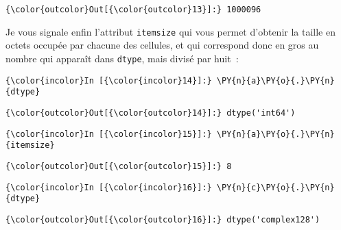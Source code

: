 \begin{Verbatim}[commandchars=\\\{\},frame=single,framerule=0.3mm,rulecolor=\color{cellframecolor}]
{\color{outcolor}Out[{\color{outcolor}13}]:} 1000096
\end{Verbatim}
            
    Je vous signale enfin l'attribut \texttt{itemsize} qui vous permet
d'obtenir la taille en octets occupée par chacune des cellules, et qui
correspond donc en gros au nombre qui apparaît dans \texttt{dtype}, mais
divisé par huit~:

    \begin{Verbatim}[commandchars=\\\{\},frame=single,framerule=0.3mm,rulecolor=\color{cellframecolor}]
{\color{incolor}In [{\color{incolor}14}]:} \PY{n}{a}\PY{o}{.}\PY{n}{dtype}
\end{Verbatim}


\begin{Verbatim}[commandchars=\\\{\},frame=single,framerule=0.3mm,rulecolor=\color{cellframecolor}]
{\color{outcolor}Out[{\color{outcolor}14}]:} dtype('int64')
\end{Verbatim}
            
    \begin{Verbatim}[commandchars=\\\{\},frame=single,framerule=0.3mm,rulecolor=\color{cellframecolor}]
{\color{incolor}In [{\color{incolor}15}]:} \PY{n}{a}\PY{o}{.}\PY{n}{itemsize}
\end{Verbatim}


\begin{Verbatim}[commandchars=\\\{\},frame=single,framerule=0.3mm,rulecolor=\color{cellframecolor}]
{\color{outcolor}Out[{\color{outcolor}15}]:} 8
\end{Verbatim}
            
    \begin{Verbatim}[commandchars=\\\{\},frame=single,framerule=0.3mm,rulecolor=\color{cellframecolor}]
{\color{incolor}In [{\color{incolor}16}]:} \PY{n}{c}\PY{o}{.}\PY{n}{dtype}
\end{Verbatim}


\begin{Verbatim}[commandchars=\\\{\},frame=single,framerule=0.3mm,rulecolor=\color{cellframecolor}]
{\color{outcolor}Out[{\color{outcolor}16}]:} dtype('complex128')
\end{Verbatim}
            
